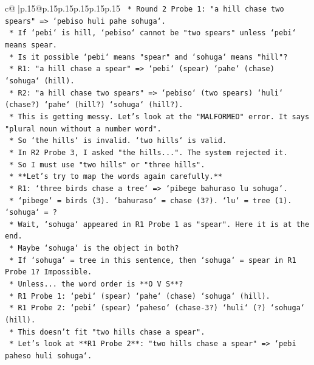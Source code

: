 \documentclass{article}
\begin{document}
{\begin{supertabular}{c@{$\;$}|p{.15\linewidth}@{}p{.15\linewidth}p{.15\linewidth}p{.15\linewidth}p{.15\linewidth}p{.15\linewidth}}
{{{\texttt{        *   Round 2 Probe 1: "a hill chase two spears" => `pebiso huli pahe sohuga`.} \\
\texttt{            *   If `pebi` is hill, `pebiso` cannot be "two spears" unless `pebi` means spear.} \\
\texttt{            *   Is it possible `pebi` means "spear" and `sohuga` means "hill"?} \\
\texttt{                *   R1: "a hill chase a spear" => `pebi` (spear) `pahe` (chase) `sohuga` (hill).} \\
\texttt{                *   R2: "a hill chase two spears" => `pebiso` (two spears) `huli` (chase?) `pahe` (hill?) `sohuga` (hill?).} \\
\texttt{                *   This is getting messy. Let's look at the "MALFORMED" error. It says "plural noun without a number word".} \\
\texttt{                *   So `the hills` is invalid. `two hills` is valid.} \\
\texttt{                *   In R2 Probe 3, I asked "the hills...". The system rejected it.} \\
\texttt{                *   So I must use "two hills" or "three hills".} \\
\texttt{    *   **Let's try to map the words again carefully.**} \\
\texttt{        *   R1: `three birds chase a tree` => `pibege bahuraso lu sohuga`.} \\
\texttt{            *   `pibege` = birds (3). `bahuraso` = chase (3?). `lu` = tree (1). `sohuga` = ?} \\
\texttt{            *   Wait, `sohuga` appeared in R1 Probe 1 as "spear". Here it is at the end.} \\
\texttt{            *   Maybe `sohuga` is the object in both?} \\
\texttt{            *   If `sohuga` = tree in this sentence, then `sohuga` = spear in R1 Probe 1? Impossible.} \\
\texttt{            *   Unless... the word order is **O V S**?} \\
\texttt{                *   R1 Probe 1: `pebi` (spear) `pahe` (chase) `sohuga` (hill).} \\
\texttt{                *   R1 Probe 2: `pebi` (spear) `paheso` (chase{-}3?) `huli` (?) `sohuga` (hill).} \\
\texttt{                *   This doesn't fit "two hills chase a spear".} \\
\texttt{        *   Let's look at **R1 Probe 2**: "two hills chase a spear" => `pebi paheso huli sohuga`.} \\
}}}
\end{supertabular}}
\end{document}
